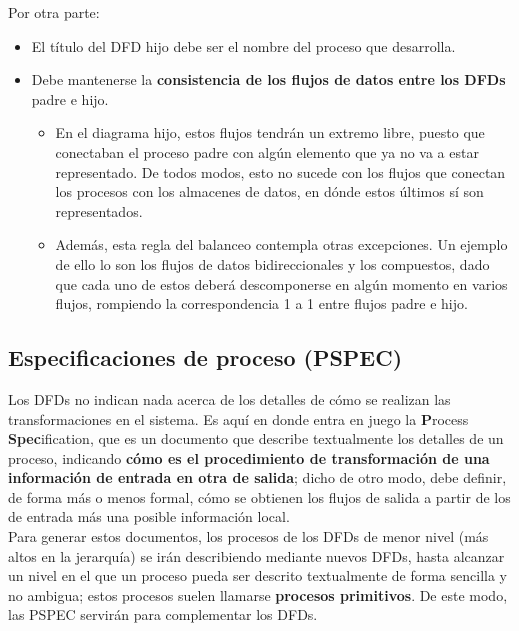 Por otra parte:

\begin{itemize}
\item El título del DFD hijo debe ser el nombre del proceso que desarrolla.

\item Debe mantenerse la \textbf{consistencia de los flujos de datos entre los DFDs} padre e hijo.
\begin{itemize}
    \item En el diagrama hijo, estos flujos tendrán un extremo libre, puesto que conectaban el proceso padre con algún elemento que ya no va a estar representado. De todos modos, esto no sucede con los flujos que conectan los procesos con los almacenes de datos, en dónde estos últimos sí son representados.
    \item Además, esta regla del balanceo contempla otras excepciones. Un ejemplo de ello lo son los flujos de datos bidireccionales y los compuestos, dado que cada uno de estos deberá descomponerse en algún momento en varios flujos, rompiendo la correspondencia 1 a 1 entre flujos padre e hijo.
\end{itemize}
\end{itemize}

\subsection{Especificaciones de proceso (PSPEC)}

Los DFDs no indican nada acerca de los detalles de cómo se realizan las transformaciones en el sistema. Es aquí en donde entra en juego la \textbf{P}rocess \textbf{Spec}ification, que es un documento que describe textualmente los detalles de un proceso, indicando \textbf{cómo es el procedimiento de transformación de una información de entrada en otra de salida}; dicho de otro modo, debe definir, de forma más o menos formal, cómo se obtienen los flujos de salida a partir de los de entrada más una posible información local.\\

Para generar estos documentos, los procesos de los DFDs de menor nivel (más altos en la jerarquía) se irán describiendo mediante nuevos DFDs, hasta alcanzar un nivel en el que un proceso pueda ser descrito textualmente de forma sencilla y no ambigua; estos procesos suelen llamarse \textbf{procesos primitivos}. De este modo, las PSPEC servirán para complementar los DFDs.\\

